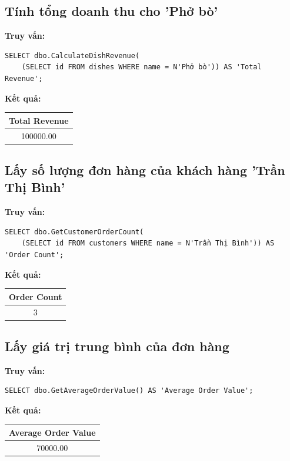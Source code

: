 \documentclass{article}
\begin{document}
\subsection{Tính tổng doanh thu cho 'Phở bò'}

\textbf{Truy vấn:}

\begin{verbatim}
SELECT dbo.CalculateDishRevenue(
    (SELECT id FROM dishes WHERE name = N'Phở bò')) AS 'Total Revenue';
\end{verbatim}

\textbf{Kết quả:}
\begin{longtable}{|c|}
\hline
Total Revenue \\
\hline
100000.00 \\
\hline
\end{longtable}

\subsection{Lấy số lượng đơn hàng của khách hàng 'Trần Thị Bình'}

\textbf{Truy vấn:}

\begin{verbatim}
SELECT dbo.GetCustomerOrderCount(
    (SELECT id FROM customers WHERE name = N'Trần Thị Bình')) AS 'Order Count';
\end{verbatim}

\textbf{Kết quả:}
\begin{longtable}{|c|}
\hline
Order Count \\
\hline
3 \\
\hline
\end{longtable}

\subsection{Lấy giá trị trung bình của đơn hàng}

\textbf{Truy vấn:}

\begin{verbatim}
SELECT dbo.GetAverageOrderValue() AS 'Average Order Value';
\end{verbatim}

\textbf{Kết quả:}
\begin{longtable}{|c|}
\hline
Average Order Value \\
\hline
70000.00 \\
\hline
\end{longtable}
\end{document}
